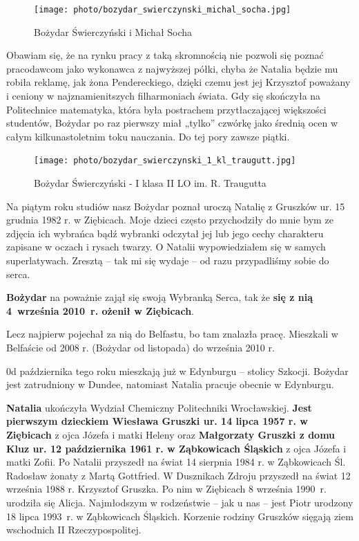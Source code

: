 \begin{figure}[!h]
\begin{center}
\texttt{[image: photo/bozydar\_swierczynski\_michal\_socha.jpg]}
\caption{Bożydar Świerczyński i Michał Socha}
\end{center}
\end{figure}

Obawiam się, że na rynku pracy z taką skromnością nie pozwoli się poznać pracodawcom jako wykonawca z najwyższej półki, chyba że Natalia będzie mu robiła reklamę, jak żona Pendereckiego, dzięki czemu jest jej Krzysztof poważany i ceniony w najznamienitszych filharmoniach świata. Gdy się skończyła na Politechnice matematyka, która była postrachem przytłaczającej większości studentów, Bożydar po raz pierwszy miał „tylko” czwórkę jako średnią ocen w całym kilkunastoletnim toku nauczania. Do tej pory zawsze piątki.
\begin{figure}[!h]
\begin{center}
\texttt{[image: photo/bozydar\_swierczynski\_1\_kl\_traugutt.jpg]}
\caption{Bożydar Świerczyński - I klasa II LO im. R. Traugutta}
\end{center}
\end{figure}

Na piątym roku studiów nasz Bożydar poznał uroczą Natalię z Gruszków ur. 15 grudnia 1982 r. w Ziębicach. Moje dzieci często przychodziły do mnie bym ze zdjęcia ich wybrańca bądź wybranki odczytał jej lub jego cechy charakteru zapisane w oczach i rysach twarzy. O Natalii wypowiedziałem się w samych superlatywach. Zresztą – tak mi się wydaje – od razu przypadliśmy sobie do serca.

\textbf{Bożydar} na poważnie zajął się swoją Wybranką Serca, tak że \textbf{się z nią 4~września 2010~r. ożenił w Ziębicach}.

Lecz najpierw pojechał za nią do Belfastu, bo tam znalazła pracę. Mieszkali w Belfaście od 2008 r. (Bożydar od listopada) do września 2010 r.

0d października tego roku mieszkają już w Edynburgu – stolicy Szkocji. Bożydar jest zatrudniony w Dundee, natomiast Natalia pracuje obecnie w Edynburgu.

\textbf{Natalia} ukończyła Wydział Chemiczny Politechniki Wrocławskiej. \textbf{Jest pierwszym dzieckiem Wiesława Gruszki ur. 14 lipca 1957 r. w Ziębicach} z ojca Józefa i matki Heleny oraz \textbf{Małgorzaty Gruszki z domu Kluz ur. 12 października 1961 r. w Ząbkowicach Śląskich} z ojca Józefa i matki Zofii. Po Natalii przyszedł na świat 14 sierpnia 1984 r. w Ząbkowicach Śl. Radosław żonaty z Martą Gottfried. W Dusznikach Zdroju przyszedł na świat 12 września 1988 r. Krzysztof Gruszka. Po nim w Ziębicach 8 września 1990~r. urodziła się Alicja. Najmłodszym w rodzeństwie – jak u nas – jest Piotr urodzony 18 lipca 1993~r. w Ząbkowicach Śląskich. Korzenie rodziny Gruszków sięgają ziem wschodnich II Rzeczypospolitej.











